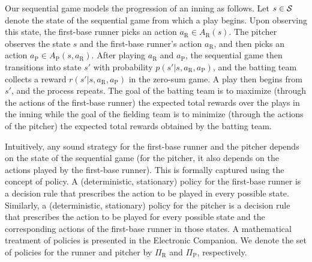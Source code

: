 \documentclass[opre,dblanonrev]{informs4}
\begin{document}
    Our sequential game models the progression of an inning as follows. Let $s \in {\cal S}$ denote the state of the sequential game from which a play begins. Upon observing this state, the first-base runner picks an action $a_\text{R} \in A_\text{R}(s)$. The pitcher observes the state $s$ and the first-base runner's action $a_\text{R}$, and then picks an action $a_\text{P} \in A_\text{P}(s,a_\text{R})$. After playing $a_\text{R}$ and $a_\text{P}$, the sequential game then transitions into state $s'$ with probability $p(s'|s,a_\text{R},a_\text{P})$, and the batting team collects a reward $r(s'|s,a_\text{R},a_\text{P})$ in the zero-sum game. A play then begins from $s'$, and the process repeats. The goal of the batting team is to maximize (through the actions of the first-base runner) the expected total rewards over the plays in the inning while the goal of the fielding team is to minimize (through the actions of the pitcher) the expected total rewards obtained by the batting team.

    Intuitively, any sound strategy for the first-base runner and the pitcher depends on the state of the sequential game (for the pitcher, it also depends on the actions played by the first-base runner). This is formally captured using the concept of policy. A (deterministic, stationary) policy for the first-base runner is a decision rule that prescribes the action to be played in every possible state. Similarly, a (deterministic, stationary) policy for the pitcher is a decision rule that prescribes the action to be played for every possible state and the corresponding actions of the first-base runner in those states. A mathematical treatment of policies is presented in the Electronic Companion. We denote the set of policies for the runner and pitcher by $\Pi_\text{R}$ and $\Pi_\text{P}$, respectively.
\end{document}
